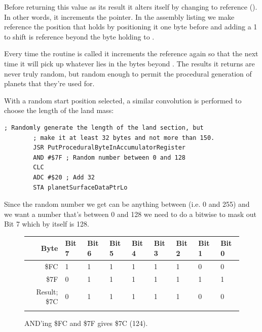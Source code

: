 \begin{definition}
Before returning this value as its result it alters itself by changing
 to reference  (). In other words, it increments the pointer. In the
assembly listing we make  reference the position
that holds  by positioning it one byte before and
adding a 1 to shift is reference beyond the byte holding  to
.

Every time the routine is called it increments the reference again so that the next time it will pick up whatever
  lies in the bytes beyond . The results it returns are never truly random, but random enough
  to permit the procedural generation of planets that they're used for.

\end{definition}

With a random start position selected, a similar convolution is performed to choose the length of the land mass:

\begin{lstlisting}[caption=A convolution.]
        ; Randomly generate the length of the land section, but
        ; make it at least 32 bytes and not more than 150.
        JSR PutProceduralByteInAccumulatorRegister
        AND #$7F ; Random number between 0 and 128
        CLC
        ADC #$20 ; Add 32
        STA planetSurfaceDataPtrLo

\end{lstlisting}

Since the random number we get can be anything between  (i.e. 0 and 255) and we want a number
that's between 0 and 128 we need to do a bitwise  to mask out Bit 7 which by itself is 128.

\begin{figure}[H]
  {
    \setlength{\tabcolsep}{3.0pt}
    \setlength\cmidrulewidth{\heavyrulewidth} %
    \begin{adjustbox}{width=10cm,center}

      \begin{tabular}{rllllllll}
        \toprule
        Byte & Bit 7 & Bit 6 & Bit 5 & Bit 4 & Bit 3 & Bit 2 & Bit 1 & Bit 0        \\
        \midrule
        \$FC & 1 & 1 & 1 & 1 & 1 & 1 & 0 & 0 \\
        \$7F & 0 & 1 & 1 & 1 & 1 & 1 & 1 & 1 \\
        \midrule
        Result; \$7C & 0 & 1 & 1 & 1 & 1 & 1 & 0 & 0 \\
        \addlinespace
        \bottomrule
      \end{tabular}

    \end{adjustbox}

  }\caption*{AND'ing \$FC and \$7F gives \$7C (124).}
\end{figure}


